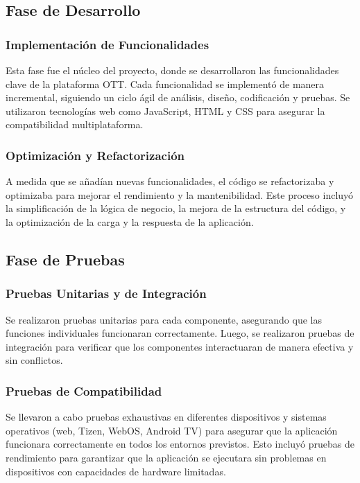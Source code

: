 \subsection{Fase de Desarrollo}
\subsubsection{Implementación de Funcionalidades}
Esta fase fue el núcleo del proyecto, donde se desarrollaron las funcionalidades clave de la 
plataforma OTT. Cada funcionalidad se implementó de manera incremental, siguiendo un ciclo 
ágil de análisis, diseño, codificación y pruebas. Se utilizaron tecnologías web como JavaScript, 
HTML y CSS para asegurar la compatibilidad multiplataforma.

\subsubsection{Optimización y Refactorización}
A medida que se añadían nuevas funcionalidades, el código se refactorizaba y optimizaba para 
mejorar el rendimiento y la mantenibilidad. Este proceso incluyó la simplificación de la lógica 
de negocio, la mejora de la estructura del código, y la optimización de la carga y la respuesta de la aplicación.

\subsection{Fase de Pruebas}
\subsubsection{Pruebas Unitarias y de Integración}
Se realizaron pruebas unitarias para cada componente, asegurando que las funciones individuales 
funcionaran correctamente. Luego, se realizaron pruebas de integración para verificar que los 
componentes interactuaran de manera efectiva y sin conflictos.

\subsubsection{Pruebas de Compatibilidad}
Se llevaron a cabo pruebas exhaustivas en diferentes dispositivos y sistemas operativos 
(web, Tizen, WebOS, Android TV) para asegurar que la aplicación funcionara correctamente 
en todos los entornos previstos. Esto incluyó pruebas de rendimiento para garantizar que 
la aplicación se ejecutara sin problemas en dispositivos con capacidades de hardware limitadas.

